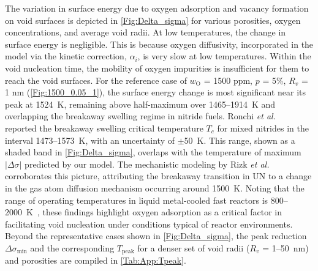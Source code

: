 \documentclass[preprint,12pt,sort&compress]{elsarticle}
\newcommand{\?}{\stackrel{?}{=}}
\begin{document}
The variation in surface energy due to oxygen adsorption and vacancy formation on void surfaces is depicted in \cref{Fig:Delta_sigma} for various porosities, oxygen concentrations, and average void radii. At low temperatures, the change in surface energy is negligible. This is because oxygen diffusivity, incorporated in the model via the kinetic correction, $\alpha_i$, is very slow at low temperatures. Within the void nucleation time, the mobility of oxygen impurities is insufficient for them to reach the void surfaces. For the reference case of $w_\text{O}$ = 1500 ppm, $p$ = 5\%, $R_v$ = 1 nm (\cref{Fig:1500_0.05_1}), the surface energy change is most significant near its peak at 1524~K, remaining above half-maximum over 1465--1914~K and overlapping the breakaway swelling regime in nitride fuels. Ronchi \textit{et al.}~\cite{Ronchi1978} reported the breakaway swelling critical temperature $T_c$ for mixed nitrides in the interval 1473--1573~K, with an uncertainty of $\pm$50~K. This range, shown as a shaded band in \cref{Fig:Delta_sigma}, overlaps with the temperature of maximum $|\Delta \sigma|$ predicted by our model. The mechanistic modeling by Rizk \textit{et al.}~\cite{Rizk2025} corroborates this picture, attributing the breakaway transition in UN to a change in the gas atom diffusion mechanism occurring around 1500~K. Noting that the range of operating temperatures in liquid metal-cooled fast reactors is 800--2000~K~\cite{Turos1990}, these findings highlight oxygen adsorption as a critical factor in facilitating void nucleation under conditions typical of reactor environments. Beyond the representative cases shown in \cref{Fig:Delta_sigma}, the peak reduction $\Delta\sigma_\text{min}$ and the corresponding $T_\text{peak}$ for a denser set of void radii ($R_v$ = 1--50~nm) and porosities are compiled in \cref{Tab:App:Tpeak}.

\end{document}
